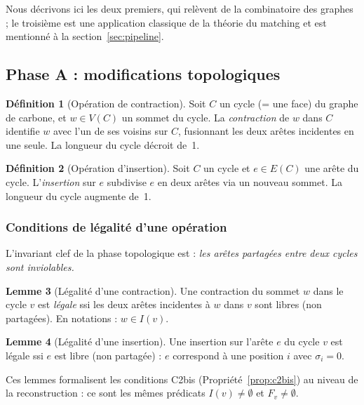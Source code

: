 \documentclass[12pt,a4paper]{article}
\theoremstyle{definition}
\newtheorem{definition}{D\'efinition}[section]
\newtheorem{lemme}[definition]{Lemme}
\theoremstyle{remark}
\begin{document}
Nous d\'ecrivons ici les deux premiers, qui rel\`event de la
combinatoire des graphes ; le troisi\`eme est une application classique
de la th\'eorie du matching et est mentionn\'e \`a la
section~\ref{sec:pipeline}.

\subsection{Phase A : modifications topologiques}

\begin{definition}[Op\'eration de contraction]
\label{def:contraction}
Soit $C$ un cycle (= une face) du graphe de carbone, et $w \in V(C)$
un sommet du cycle. La \emph{contraction} de $w$ dans $C$ identifie
$w$ avec l'un de ses voisins sur $C$, fusionnant les deux ar\^etes
incidentes en une seule. La longueur du cycle d\'ecroit de~1.
\end{definition}

\begin{definition}[Op\'eration d'insertion]
\label{def:insertion}
Soit $C$ un cycle et $e \in E(C)$ une ar\^ete du cycle. L'\emph{insertion}
sur $e$ subdivise $e$ en deux ar\^etes via un nouveau sommet. La longueur
du cycle augmente de~1.
\end{definition}

\subsubsection{Conditions de l\'egalit\'e d'une op\'eration}

L'invariant clef de la phase topologique est : \emph{les ar\^etes
partag\'ees entre deux cycles sont inviolables.}

\begin{lemme}[L\'egalit\'e d'une contraction]
\label{lem:contraction}
Une contraction du sommet $w$ dans le cycle $v$ est \emph{l\'egale}
ssi les deux ar\^etes incidentes \`a $w$ dans $v$ sont libres
(non partag\'ees). En notations : $w \in I(v)$.
\end{lemme}

\begin{lemme}[L\'egalit\'e d'une insertion]
\label{lem:insertion}
Une insertion sur l'ar\^ete $e$ du cycle $v$ est l\'egale ssi $e$ est
libre (non partag\'ee) : $e$ correspond \`a une position $i$ avec
$\sigma_i = 0$.
\end{lemme}

Ces lemmes formalisent les conditions C2bis (Propri\'et\'e~\ref{prop:c2bis})
au niveau de la reconstruction : ce sont les m\^emes pr\'edicats
$I(v) \neq \emptyset$ et $F_v \neq \emptyset$.
\end{document}
